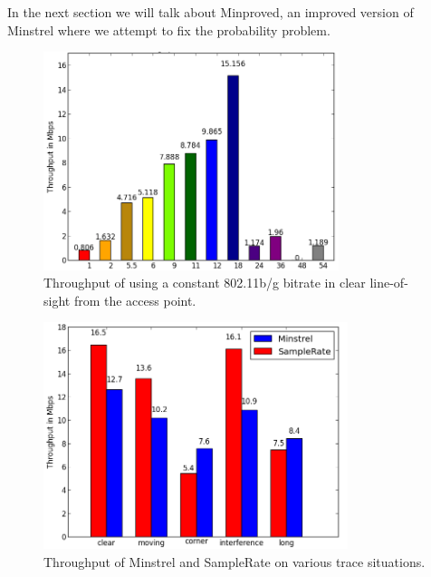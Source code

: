 \documentclass[letterpaper,twocolumn,10pt]{article}
\begin{document}
In the next section we will talk about Minproved, an improved version of Minstrel where we attempt to fix the probability problem. 

\begin{figure}[htb]
  \hspace{-1em}\includegraphics[width=3.4in]{constant.png}\vspace{-0em}
  \caption{Throughput of using a constant 802.11b/g bitrate in clear line-of-sight from the access point.}
\label{figure:2}
\end{figure}


\begin{figure}[htb]
  \hspace{-.75em}\includegraphics[width=3.5in]{MinVSSam1.png}\vspace{-0.75em}
  \caption{Throughput of Minstrel and SampleRate on various trace situations.}
\label{figure:3}
\end{figure}
\end{document}

